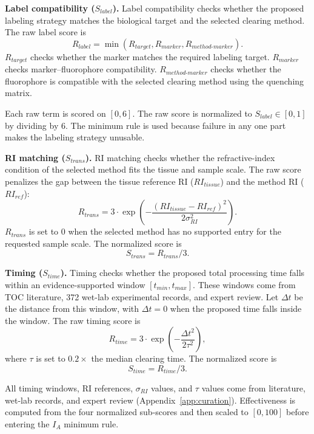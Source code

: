 \documentclass[conference]{IEEEtran}
\begin{document}
\noindent\textbf{Label compatibility ($S_{label}$).}
Label compatibility checks whether the proposed labeling strategy matches the
biological target and the selected clearing method. The raw label score is
\begin{equation}
R_{label}
= \min(R_{target}, R_{marker}, R_{method\text{-}marker}).
\end{equation}
$R_{target}$ checks whether the marker matches the required labeling target.
$R_{marker}$ checks marker--fluorophore compatibility.
$R_{method\text{-}marker}$ checks whether the fluorophore is compatible with the
selected clearing method using the quenching matrix. 

Each raw term is scored on $[0,6]$. The raw score is normalized to $S_{label}\in[0,1]$ by dividing by 6. The minimum rule is used because failure in any one part makes the labeling strategy
unusable.

\noindent\textbf{RI matching ($S_{trans}$).}
RI matching checks whether the refractive-index condition of the selected method
fits the tissue and sample scale. The raw score penalizes the gap between the
tissue reference RI ($RI_{tissue}$) and the method RI ($RI_{ref}$):
\begin{equation}
R_{trans}
= 3 \cdot
\exp\left(
-\frac{(RI_{tissue}-RI_{ref})^2}{2\sigma_{RI}^2}
\right).
\end{equation}
$R_{trans}$ is set to $0$ when the selected method has no supported entry for
the requested sample scale. The normalized score is
\begin{equation}
S_{trans} = R_{trans}/3.
\end{equation}

\noindent\textbf{Timing ($S_{time}$).}
Timing checks whether the proposed total processing time falls within an
evidence-supported window $[t_{min},t_{max}]$. These windows come from TOC
literature, 372 wet-lab experimental records, and expert review. Let $\Delta t$
be the distance from this window, with $\Delta t=0$ when the proposed time falls
inside the window. The raw timing score is
\begin{equation}
R_{time}
= 3 \cdot
\exp\left(
-\frac{\Delta t^2}{2\tau^2}
\right),
\end{equation}
where $\tau$ is set to $0.2\times$ the median clearing time. The normalized
score is
\begin{equation}
S_{time} = R_{time}/3.
\end{equation}

All timing windows, RI references, $\sigma_{RI}$ values, and $\tau$ values come
from literature, wet-lab records, and expert review
(Appendix~\ref{app:curation}). Effectiveness is computed from the four
normalized sub-scores and then scaled to $[0,100]$ before entering the $I_A$
minimum rule.
\end{document}
